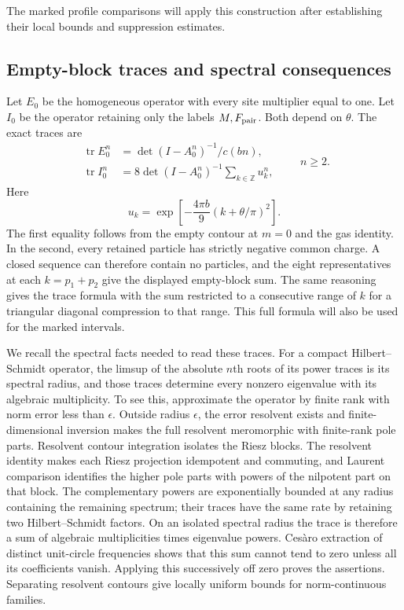 The marked profile comparisons will apply this construction after
establishing their local bounds and suppression estimates.

\subsection{Empty-block traces and spectral consequences}

Let $E_0$ be the homogeneous operator with every site multiplier equal
to one. Let $I_0$ be the operator retaining only the labels
$M,F_{\rm pair}$. Both depend on $\theta$. The exact traces are
\begin{equation}\label{j:empty-block-traces}
 \begin{split}
 \operatorname{tr}E_0^n
   &=\det(I-A_0^n)^{-1}/c(bn),\\
 \operatorname{tr}I_0^n
   &=8\det(I-A_0^n)^{-1}\sum_{k\in\mathbb Z}u_k^n,
 \end{split}
 \qquad n\ge2.
\end{equation}
Here
\[
 u_k=\exp\!\left[-\frac{4\pi b}{9}(k+\theta/\pi)^2\right].
\]
The first equality follows from the empty contour at $m=0$ and the gas
identity. In the second, every retained particle has strictly negative
common charge. A closed sequence can therefore contain no particles,
and the eight representatives at each $k=p_1+p_2$ give the displayed
empty-block sum. The same reasoning gives the trace formula with the sum
restricted to a consecutive range of $k$ for a triangular diagonal
compression to that range. This full formula will also be used for the
marked intervals.

We recall the spectral facts needed to read these traces. For a compact
Hilbert--Schmidt operator, the limsup of the absolute $n$th roots of its
power traces is its spectral radius, and those traces determine every
nonzero eigenvalue with its algebraic multiplicity. To see this,
approximate the operator by finite rank with norm error less than
$\epsilon$. Outside radius $\epsilon$, the error resolvent exists and
finite-dimensional inversion makes the full resolvent meromorphic with
finite-rank pole parts. Resolvent contour integration isolates the Riesz
blocks. The resolvent identity makes each Riesz projection idempotent and
commuting, and Laurent comparison identifies the higher pole parts with
powers of the nilpotent part on that block. The complementary powers are
exponentially bounded at any radius containing the remaining spectrum;
their traces have the same rate by retaining two Hilbert--Schmidt factors.
On an isolated spectral radius the trace is therefore a sum of algebraic
multiplicities times eigenvalue powers. Ces\`aro extraction of distinct
unit-circle frequencies shows that this sum cannot tend to zero unless
all its coefficients vanish. Applying this successively off zero proves
the assertions. Separating resolvent contours give locally uniform bounds
for norm-continuous families.

